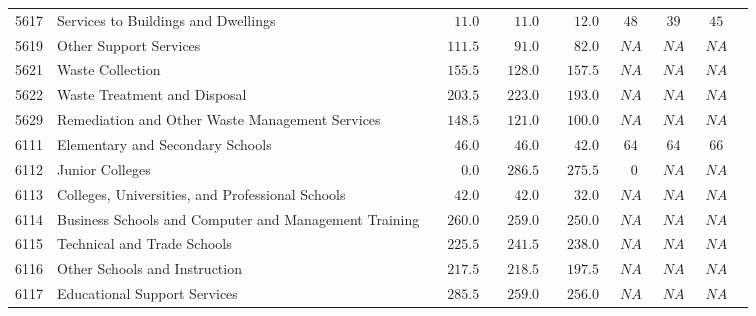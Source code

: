 \documentclass[9pt, oneside]{article}   	%
\begin{document}
\begin{longtable}{lp{3.5 in}ccccccc}
5617  & Services to Buildings and Dwellings & $\phantom{000}11.0$ & $\phantom{000}11.0$ & $\phantom{000}12.0$ & $\phantom{0}48$ & $\phantom{0}39$ & $\phantom{0}45$ \\
5619  & Other Support Services & $\phantom{00}111.5$ & $\phantom{000}91.0$ & $\phantom{000}82.0$ & $\phantom{0}NA$ & $\phantom{0}NA$ & $\phantom{0}NA$ \\
5621  & Waste Collection & $\phantom{00}155.5$ & $\phantom{00}128.0$ & $\phantom{00}157.5$ & $\phantom{0}NA$ & $\phantom{0}NA$ & $\phantom{0}NA$ \\
5622  & Waste Treatment and Disposal & $\phantom{00}203.5$ & $\phantom{00}223.0$ & $\phantom{00}193.0$ & $\phantom{0}NA$ & $\phantom{0}NA$ & $\phantom{0}NA$ \\
5629  & Remediation and Other Waste Management Services & $\phantom{00}148.5$ & $\phantom{00}121.0$ & $\phantom{00}100.0$ & $\phantom{0}NA$ & $\phantom{0}NA$ & $\phantom{0}NA$ \\
6111  & Elementary and Secondary Schools & $\phantom{000}46.0$ & $\phantom{000}46.0$ & $\phantom{000}42.0$ & $\phantom{0}64$ & $\phantom{0}64$ & $\phantom{0}66$ \\
6112  & Junior Colleges & $\phantom{0000}0.0$ & $\phantom{00}286.5$ & $\phantom{00}275.5$ & $\phantom{00}0$ & $\phantom{0}NA$ & $\phantom{0}NA$ \\
6113  & Colleges, Universities, and Professional Schools & $\phantom{000}42.0$ & $\phantom{000}42.0$ & $\phantom{000}32.0$ & $\phantom{0}NA$ & $\phantom{0}NA$ & $\phantom{0}NA$ \\
6114  & Business Schools and Computer and Management Training & $\phantom{00}260.0$ & $\phantom{00}259.0$ & $\phantom{00}250.0$ & $\phantom{0}NA$ & $\phantom{0}NA$ & $\phantom{0}NA$ \\
6115  & Technical and Trade Schools & $\phantom{00}225.5$ & $\phantom{00}241.5$ & $\phantom{00}238.0$ & $\phantom{0}NA$ & $\phantom{0}NA$ & $\phantom{0}NA$ \\
6116  & Other Schools and Instruction & $\phantom{00}217.5$ & $\phantom{00}218.5$ & $\phantom{00}197.5$ & $\phantom{0}NA$ & $\phantom{0}NA$ & $\phantom{0}NA$ \\
6117  & Educational Support Services & $\phantom{00}285.5$ & $\phantom{00}259.0$ & $\phantom{00}256.0$ & $\phantom{0}NA$ & $\phantom{0}NA$ & $\phantom{0}NA$ \\

\end{longtable}
\end{document}
